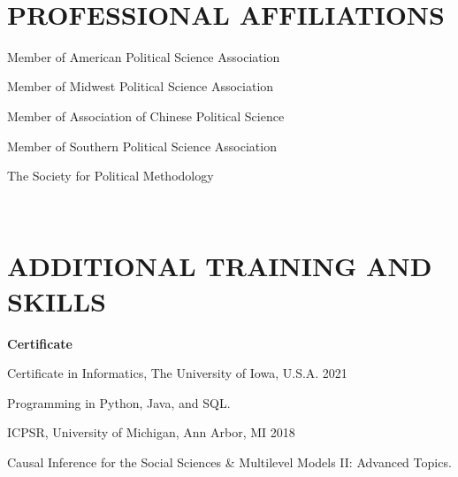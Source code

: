\documentclass[10.5pt,]{article}
\providecommand{\tightlist}{%
	\setlength{\itemsep}{0pt}\setlength{\parskip}{0pt}}
\renewenvironment{itemize}{
	\begin{list}{}{
			\setlength{\leftmargin}{1.5em}
		}
	}{
	\end{list}
}
\begin{document}
 ~

 \hypertarget{professional-affiliations}{%
 \section{PROFESSIONAL AFFILIATIONS}\label{professional-affiliations}}

 \begin{itemize}
 \tightlist
 \item
   Member of American Political Science Association
 \item
   Member of Midwest Political Science Association
 \item
   Member of Association of Chinese Political Science
 \item
   Member of Southern Political Science Association
 \item
   The Society for Political Methodology
 \end{itemize}

 ~

 \hypertarget{additional-training-and-skills}{%
 \section{ADDITIONAL TRAINING AND
 SKILLS}\label{additional-training-and-skills}}

 \begin{itemize}
 \tightlist
 \item
   \textbf{Certificate}

   \begin{itemize}
   \tightlist
   \item
     Certificate in Informatics, The University of Iowa, U.S.A.
     \hfill 2021

     \begin{itemize}
     \tightlist
     \item
       Programming in Python, Java, and SQL.
     \end{itemize}
   \item
     ICPSR, University of Michigan, Ann Arbor, MI \hfill 2018

     \begin{itemize}
     \tightlist
     \item
       Causal Inference for the Social Sciences \& Multilevel Models II:
       Advanced Topics.
     \end{itemize}
   \end{itemize}
 \end{itemize}
\end{document}
